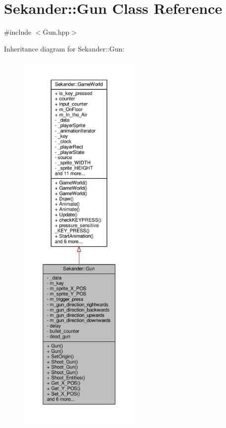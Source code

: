 \hypertarget{classSekander_1_1Gun}{}\section{Sekander\+:\+:Gun Class Reference}
\label{classSekander_1_1Gun}


{\ttfamily \#include $<$Gun.\+hpp$>$}



Inheritance diagram for Sekander\+:\+:Gun\+:
\nopagebreak
\begin{figure}[H]
\begin{center}
\leavevmode
\includegraphics[height=550pt]{classSekander_1_1Gun__inherit__graph}
\end{center}
\end{figure}


